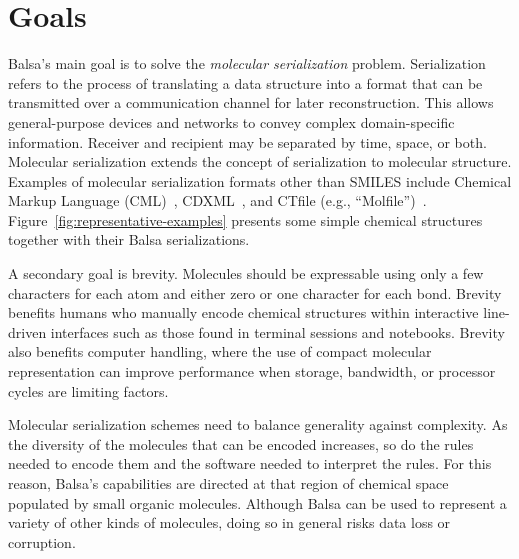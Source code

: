 \documentclass{article}
\begin{document}
\section*{Goals}

Balsa's main goal is to solve the \textit{molecular serialization} problem. Serialization refers to the process of translating a data structure into a format that can be transmitted over a communication channel for later reconstruction. This allows general-purpose devices and networks to convey complex domain-specific information. Receiver and recipient may be separated by time, space, or both. Molecular serialization extends the concept of serialization to molecular structure. Examples of molecular serialization formats other than SMILES include Chemical Markup Language (CML)~\cite{murray-rust:2011}, CDXML~\cite{cdxml}, and CTfile (e.g., \enquote{Molfile})~\cite{ctfileFormats}. Figure~\ref{fig:representative-examples} presents some simple chemical structures together with their Balsa serializations.

A secondary goal is brevity. Molecules should be expressable using only a few characters for each atom and either zero or one character for each bond. Brevity benefits humans who manually encode chemical structures within interactive line-driven interfaces such as those found in terminal sessions and notebooks. Brevity also benefits computer handling, where the use of compact molecular representation can improve performance when storage, bandwidth, or processor cycles are limiting factors.

Molecular serialization schemes need to balance generality against complexity. As the diversity of the molecules that can be encoded increases, so do the rules needed to encode them and the software needed to interpret the rules. For this reason, Balsa's capabilities are directed at that region of chemical space populated by small organic molecules. Although Balsa can be used to represent a variety of other kinds of molecules, doing so in general risks data loss or corruption.
\end{document}
